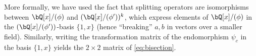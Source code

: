   More formally, we have used the fact that splitting operators are isomorphisms between $\bQ[x]/(\phi)$ and $(\bQ[x]/(\phi'))^k$, which express elements of $\bQ[x]/(\phi)$ in the $(\bQ[x]/(\phi'))$-basis $\{1,x\}$ (hence ``breaking'' $a,b$ in vectors over a smaller field). Similarly, writing the transformation matrix of the endomorphism $\psi_c$ in the basis $\{1,x\}$ yields the $2\times 2$ matrix of \eqref{eq:bisection}.



